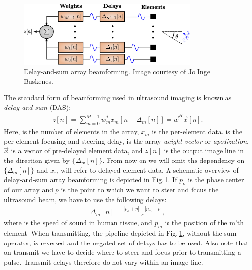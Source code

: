 \begin{figure}
\centering
\includegraphics[width=0.8\textwidth]{img/beamforming_das.eps}
\caption{Delay-and-sum array beamforming. Image courtesy of Jo Inge Buskenes.}
\label{fig:das_background}
\end{figure}

The standard form of beamforming used in ultrasound imaging is known as \textit{delay-and-sum} (DAS): 
\begin{align}\label{eq:das_background}
z[n] = \sum_{m = 0}^{M-1}w_m^*x_m[n - \Delta_m[n]] = \vec{w}^H\vec{x}[n].
\end{align}
Here,  is the number of elements in the array, $x_m$ is the per-element data,  is the per-element focusing and steering delay,  is the array \textit{weight vector} or \textit{apodization}, $\vec{x}$ is a vector of pre-delayed element data, and $z[n]$ is the output image line in the direction given by $\{\Delta_m[n]\}$.  From now on we will omit the dependency on $\{\Delta_m[n]\}$ and $x_m$ will refer to delayed element data. A schematic overview of delay-and-sum array beamforming is depicted in Fig.\,\ref{fig:das_background}. If $p_o$ is the phase center of our array and $p$ is the point to which we want to steer and focus the ultrasound beam, we have to use the following delays:
\begin{align}
\Delta_m[n] =\frac{|p_o+p| - |p_m+p|}{c},
\end{align}
where  is the speed of sound in human tissue, and $p_m$ is the position of the m'th element. When transmitting, the pipeline depicted in Fig.\,\ref{fig:das_background}, without the sum operator, is reversed and the negated set of delays has to be used. Also note that on transmit we have to decide where to steer and focus prior to transmitting a pulse. Transmit delays therefore do not vary within an image line.

